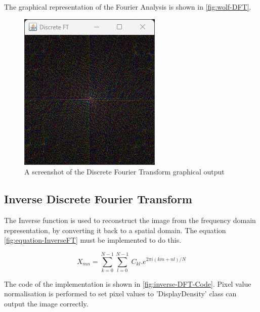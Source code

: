     The graphical representation of the Fourier Analysis is shown in \autoref{fig:wolf-DFT}. 
    
    \begin{figure}[H]
        \centering
        \includegraphics[width=0.49\columnwidth]{Figures/Week 1/W1-FT.png}
        \caption{A screenshot of the Discrete Fourier Transform graphical output}
        \label{fig:wolf-DFT}
    \end{figure}
    
    
    \subsection{Inverse Discrete Fourier Transform}
    The Inverse function is used to reconstruct the image from the frequency domain representation, by converting it back to a spatial domain. The equation \autoref{fig:equation-InverseFT} must be implemented to do this. 

    \begin{center}
        \begin{equation}
            X_{mn} = \sum_{k=0}^{N-1} \sum_{l=0}^{N-1}\ C_{kl} . e^{2\pi i(km+nl)/N}
            \label{fig:equation-InverseFT}
        \end{equation}  
        \end{center}
        
    The code of the implementation is shown in \autoref{fig:inverse-DFT-Code}.  Pixel value normalisation is performed to set pixel values to 'DisplayDensity' class can output the image correctly. 
        
